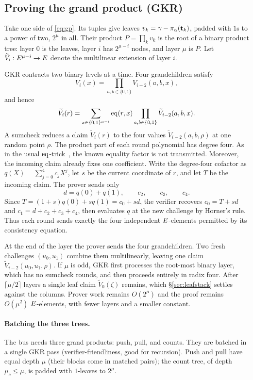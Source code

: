 \subsection{Proving the grand product (GKR)}\label{sec:gkr}

Take one side of \eqref{eq:gp}. Its tuples give leaves $v_k=\gamma-\pi_\alpha(\mathbf{t}_k)$, padded with $1$s to a power of two, $2^\mu$ in all. Their product $P=\prod_kv_k$ is the root of a binary product tree: layer $0$ is the leaves, layer $i$ has $2^{\mu-i}$ nodes, and layer $\mu$ is $P$. Let $\widetilde V_i:E^{\mu-i}\to E$ denote the multilinear extension of layer $i$.

GKR contracts two binary levels at a time. Four grandchildren satisfy
\[
V_i(x)=\prod_{a,b\in\{0,1\}}V_{i-2}(a,b,x),
\]
and hence
\[
\widetilde V_i(r)=\sum_{x\in\{0,1\}^{\mu-i}}\operatorname{eq}(r,x)\prod_{a,b\in\{0,1\}}\widetilde V_{i-2}(a,b,x).
\]
A sumcheck reduces a claim $\widetilde V_i(r)$ to the four values $\widetilde V_{i-2}(a,b,\rho)$ at one random point $\rho$. The product part of each round polynomial has degree four. As in the usual $\operatorname{eq}$-trick~\cite{Gru24}, the known equality factor is not transmitted. Moreover, the incoming claim already fixes one coefficient. Write the degree-four cofactor as $q(X)=\sum_{j=0}^{4}c_jX^j$, let $s$ be the current coordinate of $r$, and let $T$ be the incoming claim. The prover sends only
\[
d=q(0)+q(1),\qquad c_2,\qquad c_3,\qquad c_4.
\]
Since $T=(1+s)q(0)+sq(1)=c_0+sd$, the verifier recovers $c_0=T+sd$ and $c_1=d+c_2+c_3+c_4$, then evaluates $q$ at the new challenge by Horner's rule. Thus each round sends exactly the four independent $E$-elements permitted by its consistency equation.

At the end of the layer the prover sends the four grandchildren. Two fresh challenges $(u_0,u_1)$ combine them multilinearly, leaving one claim $\widetilde V_{i-2}(u_0,u_1,\rho)$. If $\mu$ is odd, GKR first processes the root-most binary layer, which has no sumcheck rounds, and then proceeds entirely in radix four. After $\lceil\mu/2\rceil$ layers a single leaf claim $\widetilde V_0(\zeta)$ remains, which \S\ref{sec:leafstack} settles against the columns. Prover work remains $O(2^\mu)$ and the proof remains $O(\mu^2)$ $E$-elements, with fewer layers and a smaller constant.

\paragraph{Batching the three trees.} The bus needs three grand products: push, pull, and counts. They are batched in a single GKR pass (verifier-friendliness, good for recursion). Push and pull have equal depth $\mu$ (their blocks come in matched pairs); the count tree, of depth $\mu_c\le\mu$, is padded with $1$-leaves to $2^{\mu}$.


